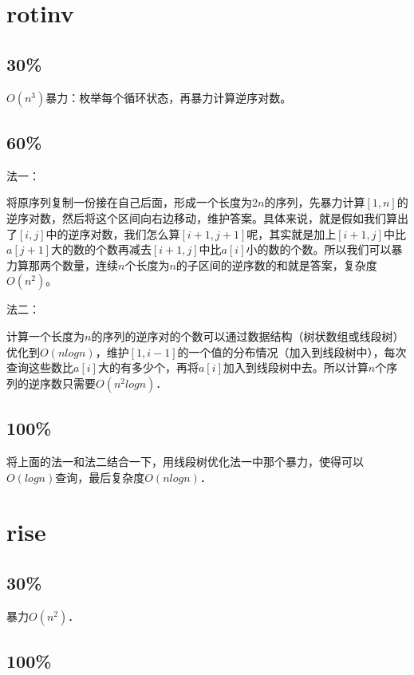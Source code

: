 \documentclass{article}
\begin{document}
	\section{rotinv}
		\subsection{30\%}
		
			$O(n^3)$暴力：枚举每个循环状态，再暴力计算逆序对数。
			
		\subsection{60\%}
			法一：
			
			将原序列复制一份接在自己后面，形成一个长度为$2n$的序列，先暴力计算$[1,n]$的逆序对数，然后将这个区间向右边移动，维护答案。具体来说，就是假如我们算出了$[i,j]$中的逆序对数，我们怎么算$[i+1,j+1]$呢，其实就是加上$[i+1,j]$中比$a[j+1]$大的数的个数再减去$[i+1,j]$中比$a[i]$小的数的个数。所以我们可以暴力算那两个数量，连续$n$个长度为$n$的子区间的逆序数的和就是答案，复杂度$O(n^2)$。
			
			法二：
			
			计算一个长度为$n$的序列的逆序对的个数可以通过数据结构（树状数组或线段树）优化到$O(nlogn)$，维护$[1,i-1]$的一个值的分布情况（加入到线段树中），每次查询这些数比$a[i]$大的有多少个，再将$a[i]$加入到线段树中去。所以计算$n$个序列的逆序数只需要$O(n^2logn)$．
			
		\subsection{100\%}
			
			将上面的法一和法二结合一下，用线段树优化法一中那个暴力，使得可以$O(logn)$查询，最后复杂度$O(nlogn)$．
		
		\newpage
		
	\section{rise}
		\subsection{30\%}
		
		暴力$O(n^2)$．
		
		\subsection{100\%}
		
\end{document}
